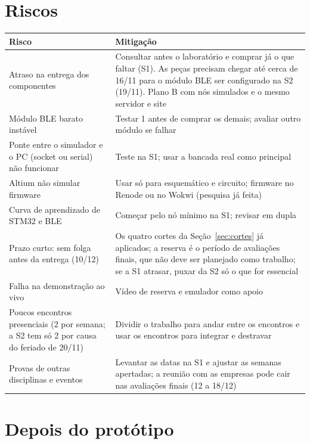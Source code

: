 \documentclass[11pt,a4paper]{article}
\begin{document}
\section{Riscos}

\begin{center}
\begin{tabular}{|L{6.0cm}|L{9.8cm}|}
\hline
\textbf{Risco} & \textbf{Mitigação} \\ \hline
Atraso na entrega dos componentes & Consultar antes o laboratório e comprar já o que faltar (S1). As peças precisam chegar até cerca de 16/11 para o módulo BLE ser configurado na S2 (19/11). Plano B com nós simulados e o mesmo servidor e site \\ \hline
Módulo BLE barato instável & Testar 1 antes de comprar os demais; avaliar outro módulo se falhar \\ \hline
Ponte entre o simulador e o PC (socket ou serial) não funcionar & Teste na S1; usar a bancada real como principal \\ \hline
Altium não simular firmware & Usar só para esquemático e circuito; firmware no Renode ou no Wokwi (pesquisa já feita) \\ \hline
Curva de aprendizado de STM32 e BLE & Começar pelo nó mínimo na S1; revisar em dupla \\ \hline
Prazo curto: sem folga antes da entrega (10/12) & Os quatro cortes da Seção~\ref{sec:cortes} já aplicados; a reserva é o período de avaliações finais, que não deve ser planejado como trabalho; se a S1 atrasar, puxar da S2 só o que for essencial \\ \hline
Falha na demonstração ao vivo & Vídeo de reserva e emulador como apoio \\ \hline
Poucos encontros presenciais (2 por semana; a S2 tem só 2 por causa do feriado de 20/11) & Dividir o trabalho para andar entre os encontros e usar os encontros para integrar e destravar \\ \hline
Provas de outras disciplinas e eventos & Levantar as datas na S1 e ajustar as semanas apertadas; a reunião com as empresas pode cair nas avaliações finais (12 a 18/12) \\ \hline
\end{tabular}
\end{center}

\section{Depois do protótipo}
\end{document}
